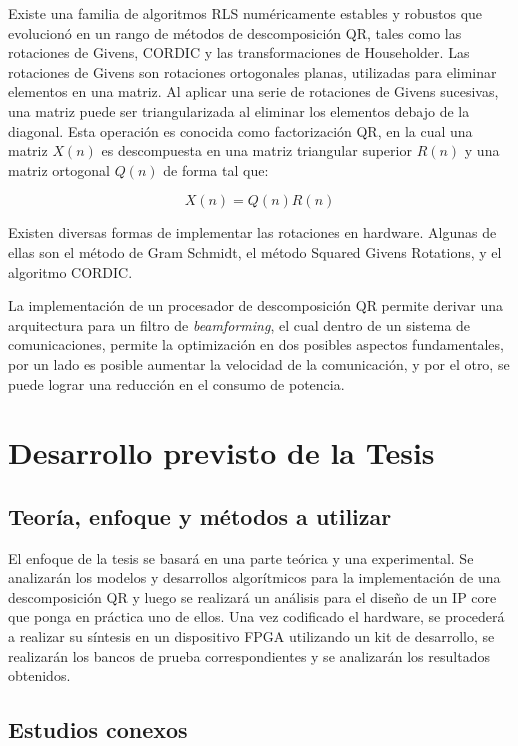 \documentclass[a4paper]{article}
\begin{document}
Existe una familia de algoritmos RLS numéricamente estables y robustos que evolucionó en un rango de métodos de descomposición QR, tales como las rotaciones de Givens, CORDIC y las transformaciones de Householder. Las rotaciones de Givens son rotaciones ortogonales planas, utilizadas para eliminar elementos en una matriz. Al aplicar una serie de rotaciones de Givens sucesivas, una matriz puede ser triangularizada al eliminar los elementos debajo de la diagonal. Esta operación es conocida como factorización QR, en la cual una matriz $X(n)$ es descompuesta en una matriz triangular superior $R(n)$ y una matriz ortogonal $Q(n)$ de forma tal que:

\[
X(n) = Q(n)R(n)
\]

Existen diversas formas de implementar las rotaciones en hardware. Algunas de ellas son el método de Gram Schmidt, el método Squared Givens Rotations, y el algoritmo CORDIC.

La implementación de un procesador de descomposición QR permite derivar una arquitectura para un filtro de \textit{beamforming}, el cual dentro de un sistema de comunicaciones, permite la optimización en dos posibles aspectos fundamentales, por un lado es posible aumentar la velocidad de la comunicación, y por el otro, se puede lograr una reducción en el consumo de potencia.

\section{Desarrollo previsto de la Tesis}

\subsection{Teoría, enfoque y métodos a utilizar}

El enfoque de la tesis se basará en una parte teórica y una experimental.
Se analizarán los modelos y desarrollos algorítmicos para la implementación de una descomposición QR y luego se realizará un análisis para el diseño de un IP core que ponga en práctica uno de ellos. Una vez codificado el hardware, se procederá a realizar su síntesis en un dispositivo FPGA utilizando un kit de desarrollo, se realizarán los bancos de prueba correspondientes y se analizarán los resultados obtenidos. 

\subsection{Estudios conexos}
\end{document}
